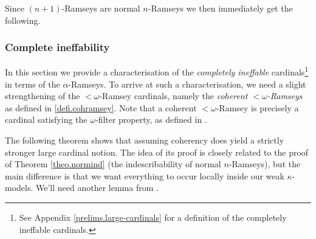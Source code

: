 \documentclass[../../main]{subfiles}
\begin{document}
Since $(n{+}1)$-Ramseys are normal $n$-Ramseys we then immediately get the following.



\subsubsection{Complete ineffability}

In this section we provide a characterisation of the \textit{completely ineffable} cardinals\footnote{See Appendix \ref{prelims.large-cardinals} for a definition of the completely ineffable cardinals.} in terms of the $\alpha$-Ramseys. To arrive at such a characterisation, we need a slight strengthening of the ${<}\omega$-Ramsey cardinals, namely the \textit{coherent ${<}\omega$-Ramseys} as defined in \ref{defi.cohramsey}. Note that a coherent ${<}\omega$-Ramsey is precisely a cardinal satisfying the $\omega$-filter property, as defined in \cite{HolySchlicht}.

\qquad The following theorem shows that assuming coherency does yield a strictly stronger large cardinal notion. The idea of its proof is closely related to the proof of Theorem \ref{theo.normind} (the indescribability of normal $n$-Ramseys), but the main difference is that we want everything to occur locally inside our weak $\kappa$-models. We'll need another lemma from \cite{Abramson}.

\end{document}
